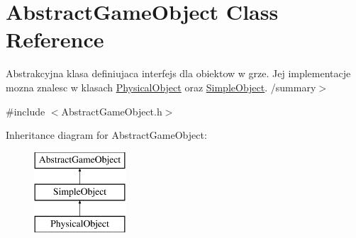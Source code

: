 \hypertarget{class_abstract_game_object}{}\section{Abstract\+Game\+Object Class Reference}
\label{class_abstract_game_object}


Abstrakcyjna klasa definiujaca interfejs dla obiektow w grze. Jej implementacje mozna znalesc w klasach \hyperlink{class_physical_object}{Physical\+Object} oraz \hyperlink{class_simple_object}{Simple\+Object}. /summary$>$  




{\ttfamily \#include $<$Abstract\+Game\+Object.\+h$>$}

Inheritance diagram for Abstract\+Game\+Object\+:\begin{figure}[H]
\begin{center}
\leavevmode
\includegraphics[height=3.000000cm]{class_abstract_game_object}
\end{center}
\end{figure}
